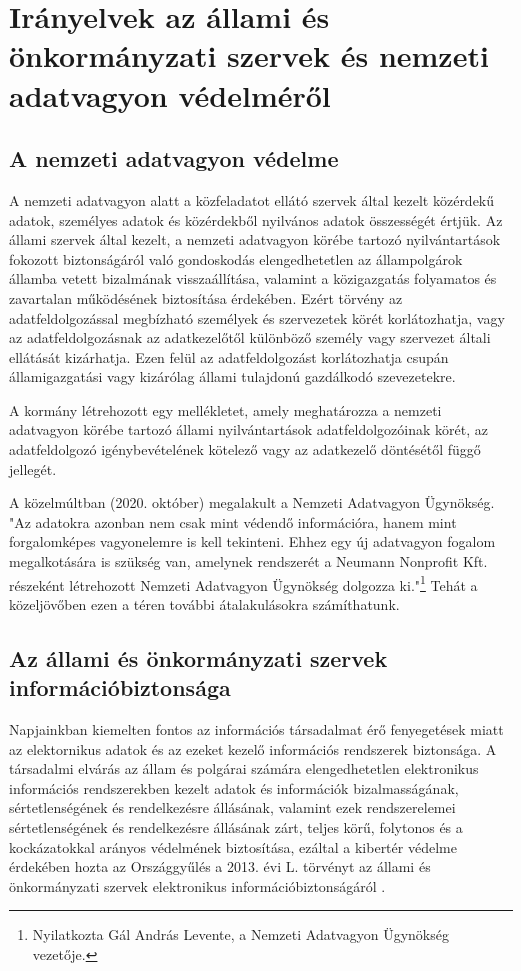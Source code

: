 \section{Irányelvek az állami és önkormányzati szervek és nemzeti adatvagyon védelméről}

\subsection*{A nemzeti adatvagyon védelme}

A nemzeti adatvagyon alatt a közfeladatot ellátó szervek által kezelt közérdekű adatok, személyes adatok és közérdekből nyilvános adatok összességét értjük. Az állami szervek által kezelt, a nemzeti adatvagyon körébe tartozó nyilvántartások fokozott biztonságáról való gondoskodás elengedhetetlen az állampolgárok államba vetett bizalmának visszaállítása, valamint a közigazgatás folyamatos és zavartalan működésének biztosítása érdekében. Ezért törvény az adatfeldolgozással megbízható személyek és szervezetek körét korlátozhatja, vagy az adatfeldolgozásnak az adatkezelőtől különböző személy vagy szervezet általi ellátását kizárhatja. Ezen felül az adatfeldolgozást korlátozhatja csupán államigazgatási vagy kizárólag állami tulajdonú gazdálkodó szevezetekre. \cite{2010-CLVII-torveny}

A kormány létrehozott egy mellékletet, amely meghatározza a nemzeti adatvagyon körébe tartozó állami nyilvántartások adatfeldolgozóinak körét, az adatfeldolgozó igénybevételének kötelező vagy az adatkezelő döntésétől függő jellegét. \cite{38/2011}

A közelmúltban (2020. október) megalakult a Nemzeti Adatvagyon Ügynökség. "Az adatokra azonban nem csak mint védendő információra, hanem mint forgalomképes vagyonelemre is kell tekinteni. Ehhez egy új adatvagyon fogalom megalkotására is szükség van, amelynek rendszerét a Neumann Nonprofit Kft. részeként létrehozott Nemzeti Adatvagyon Ügynökség dolgozza ki."\footnote{Nyilatkozta Gál András Levente, a Nemzeti Adatvagyon Ügynökség vezetője.} Tehát a közeljövőben ezen a téren további átalakulásokra számíthatunk.

\subsection*{Az állami és önkormányzati szervek információbiztonsága}

Napjainkban kiemelten fontos az információs társadalmat érő fenyegetések miatt az elektornikus adatok és az ezeket kezelő információs rendszerek biztonsága. A társadalmi elvárás az állam és polgárai számára elengedhetetlen elektronikus információs rendszerekben kezelt adatok és információk bizalmasságának, sértetlenségének és rendelkezésre állásának, valamint ezek rendszerelemei sértetlenségének és rendelkezésre állásának zárt, teljes körű, folytonos és a kockázatokkal arányos védelmének biztosítása, ezáltal a kibertér védelme érdekében hozta az Országgyűlés a 2013. évi L. törvényt az állami és önkormányzati szervek elektronikus információbiztonságáról \cite{2013-L-torveny}.